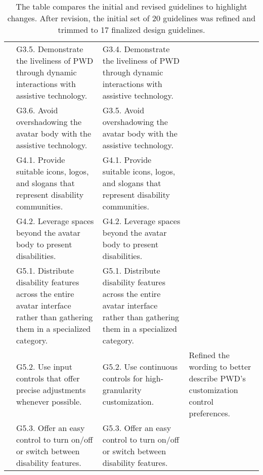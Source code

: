 \begin{table*}
\begin{tabular}{|p{0.5cm}|p{5.9cm}|p{5.9cm}|p{3.9cm}|}
& G3.5. Demonstrate the liveliness of PWD through dynamic interactions with assistive technology. 
& G3.4. Demonstrate the liveliness of PWD through dynamic interactions with assistive technology.
& %
\\ \cline{2-4}

& G3.6. Avoid overshadowing the avatar body with the assistive technology. 
& G3.5. Avoid overshadowing the avatar body with the assistive technology.
&  \\
\hline

\multirow{2}{*}{\rotatebox[origin=c]{90}{\parbox{1.4cm}{\centering \textbf{G4. Peri-}\\\textbf{pherals}}}} 
& G4.1. Provide suitable icons, logos, and slogans that represent disability communities. 
& G4.1. Provide suitable icons, logos, and slogans that represent disability communities.
&  \\ \cline{2-4}

& G4.2. Leverage spaces beyond the avatar body to present disabilities.
& G4.2. Leverage spaces beyond the avatar body to present disabilities.
&  \\
\hline

\multirow{3}{*}{\rotatebox[origin=c]{90}{\parbox{2.5cm}{\centering \textbf{G5. Interface}}}} 
& G5.1. Distribute disability features across the entire avatar interface rather than gathering them in a specialized category.
& G5.1. Distribute disability features across the entire avatar interface rather than gathering them in a specialized category. 
&  \\ \cline{2-4}

& G5.2. Use input controls that offer precise adjustments whenever possible. 
& G5.2. Use continuous controls for high-granularity customization. 
& Refined the wording to better describe PWD's customization control preferences. \\ \cline{2-4}

& G5.3. Offer an easy control to turn on/off or switch between disability features.
& G5.3. Offer an easy control to turn on/off or switch between disability features.
&  \\
\hline

\end{tabular}
\caption{The table compares the initial and revised guidelines to highlight changes. After revision, the initial set of 20 guidelines was refined and trimmed to 17 finalized design guidelines.}
\Description{}
\label{tab:changes}
\end{table*}